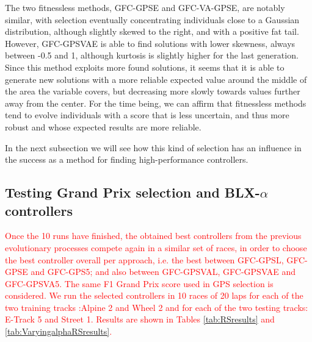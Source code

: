 \documentclass[10pt,journal,compsoc]{IEEEtran}
\begin{document}
The two fitnessless methods, {\sf GFC-GPSE} and {\sf GFC-VA-GPSE}, are
notably similar, with selection eventually concentrating individuals
close to a Gaussian distribution, although slightly skewed to the
right, and with a positive fat tail. However, {\sf GFC-GPSVAE} is able
to find solutions with lower skewness, always between -0.5 and 1,
although kurtosis is slightly higher for the last generation. Since
this method exploits more found solutions, it seems that it is able to
generate new solutions with a more reliable expected value around the
middle of the area the variable covers, but decreasing more slowly
towards values further away from the center. For the time being,
we can affirm that fitnessless methods tend to evolve individuals
with a score that is less uncertain, and thus more robust and whose
expected results are more reliable.

In the next subsection we will see how this kind of selection has an influence in the success as a method for finding high-performance controllers.



\subsection{Testing Grand Prix selection and BLX-$\alpha$ controllers}

\textcolor{red}{
Once the 10 runs have finished, the obtained best controllers from the
previous evolutionary processes compete again in a similar set of races, in order to choose the best controller overall per approach, i.e. the best between {\sf GFC-GPSL}, {\sf GFC-GPSE} and {\sf GFC-GPS5}; and also between {\sf GFC-GPSVAL}, {\sf GFC-GPSVAE} and {\sf GFC-GPSVA5}. The same F1 Grand Prix score used in GPS selection is considered. We run the selected controllers in 10 races of 20 laps for each of the two training tracks :Alpine 2  and Wheel 2  and  for each of the two testing tracks: E-Track 5 and Street 1. Results are shown in Tables \ref{tab:RSresults} and \ref{tab:VaryingalphaRSresults}.}
\end{document}
